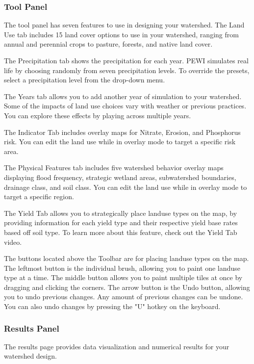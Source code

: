 \documentclass[11pt]{article}
\begin{document}
\subsubsection{Tool Panel}
The tool panel has seven features to use in designing your watershed. The Land Use tab includes 15 land cover options to use in your watershed, ranging from annual and perennial crops to pasture, forests, and native land cover.

The Precipitation tab shows the precipitation for each year. PEWI simulates real life by choosing randomly from seven precipitation levels. To override the presets, select a precipitation level from the drop-down menu.

The Years tab allows you to add another year of simulation to your watershed. Some of the impacts of land use choices vary with weather or previous practices. You can explore these effects by playing across multiple years.

The Indicator Tab includes overlay maps for Nitrate, Erosion, and Phosphorus risk. You can edit the land use while in overlay mode to target a specific risk area.

The Physical Features tab includes five watershed behavior overlay maps displaying flood frequency, strategic wetland areas, subwatershed boundaries, drainage class, and soil class. You can edit the land use while in overlay mode to target a specific region.

The Yield Tab allows you to strategically place landuse types on the map, by providing information for each yield type and their respective yield base rates based off soil type. To learn more about this feature, check out the Yield Tab video.

The buttons located above the Toolbar are for placing landuse types on the map. The leftmost button is the individual brush, allowing you to paint one landuse type at a time. The middle button allows you to paint multiple tiles at once by dragging and clicking the corners. The arrow button is the Undo button, allowing you to undo previous changes. Any amount of previous changes can be undone. You can also undo changes by pressing the "U" hotkey on the keyboard. 

\subsubsection{Results Panel}
The results page provides data visualization and numerical results for your watershed design.
\end{document}
